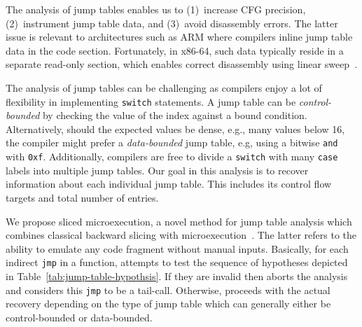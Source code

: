 The analysis of jump tables enables us to
(1)~increase CFG precision,
(2)~instrument jump table data, and
(3)~avoid disassembly errors.
The latter issue is relevant to architectures such as ARM where compilers inline jump table data in the code section.
Fortunately, in x86-64, such data typically reside in a separate read-only section, which enables correct disassembly using linear sweep~\cite{AndriesseUsenixSec16}.


The analysis of jump tables can be challenging as compilers enjoy a lot of flexibility in implementing \texttt{switch} statements.
A jump table can be \textit{control-bounded} by checking the value of the index against a bound condition.
Alternatively, should the expected values be dense, e.g., many values below 16, the compiler might prefer a \textit{data-bounded} jump table, e.g, using a bitwise \texttt{and} with \texttt{0xf}.
Additionally, compilers are free to divide a \texttt{switch} with many \texttt{case} labels into multiple jump tables.
Our goal in this analysis is to recover information about each individual jump table.
This includes its control flow targets and total number of entries.

We propose sliced microexecution, a novel method for jump table analysis which combines classical backward slicing with microexecution~\cite{Godefroid2014}.
The latter refers to the ability to emulate any code fragment without manual inputs.
Basically, for each indirect \texttt{jmp} in a function, {\bcov} attempts to test the sequence of hypotheses depicted in Table~\ref{tab:jump-table-hypothsis}.
If they are invalid then {\bcov} aborts the analysis and considers this \texttt{jmp} to be a tail-call.
Otherwise, {\bcov} proceeds with the actual recovery depending on the type of jump table which can generally either be control-bounded or data-bounded.


